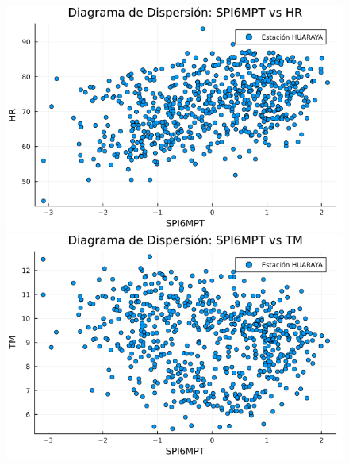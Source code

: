 \begin{figure}[htbp]
\begin{minipage}{0.32\textwidth}
\end{minipage}

\vspace{0.5cm}  %

\begin{minipage}{0.32\textwidth}
    \centering
    \includegraphics[width=\linewidth]{Capitulos/Scaterplot/HUARAYA_SPI6MPT_vs_HR.png}
\end{minipage}\hfill
\begin{minipage}{0.32\textwidth}
    \centering
    \includegraphics[width=\linewidth]{Capitulos/Scaterplot/HUARAYA_SPI6MPT_vs_TM.png}
\end{minipage}\hfill
\begin{minipage}{0.32\textwidth}
    \centering

\end{minipage}
\end{figure}
